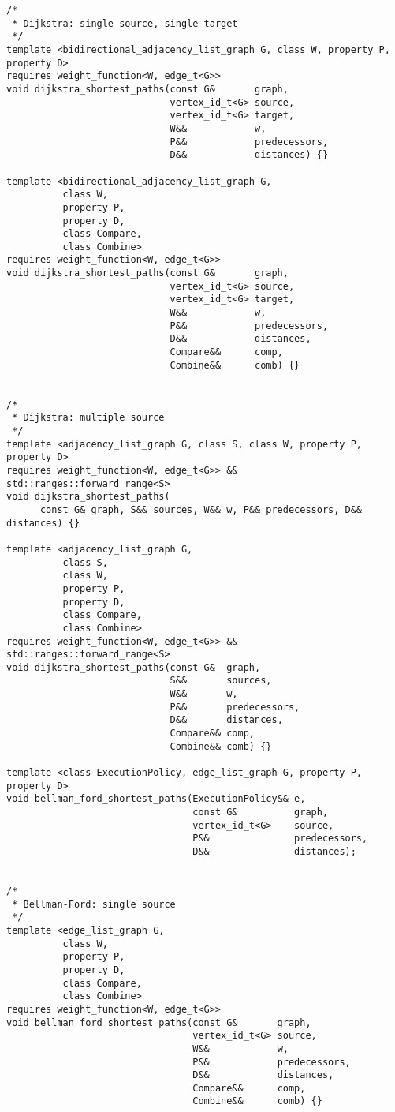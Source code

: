 \begin{lstlisting}
/*
 * Dijkstra: single source, single target
 */
template <bidirectional_adjacency_list_graph G, class W, property P, property D>
requires weight_function<W, edge_t<G>>
void dijkstra_shortest_paths(const G&       graph,
                             vertex_id_t<G> source,
                             vertex_id_t<G> target,
                             W&&            w,
                             P&&            predecessors,
                             D&&            distances) {}

template <bidirectional_adjacency_list_graph G,
          class W,
          property P,
          property D,
          class Compare,
          class Combine>
requires weight_function<W, edge_t<G>>
void dijkstra_shortest_paths(const G&       graph,
                             vertex_id_t<G> source,
                             vertex_id_t<G> target,
                             W&&            w,
                             P&&            predecessors,
                             D&&            distances,
                             Compare&&      comp,
                             Combine&&      comb) {}


/*
 * Dijkstra: multiple source
 */
template <adjacency_list_graph G, class S, class W, property P, property D>
requires weight_function<W, edge_t<G>> && std::ranges::forward_range<S>
void dijkstra_shortest_paths(
      const G& graph, S&& sources, W&& w, P&& predecessors, D&& distances) {}

template <adjacency_list_graph G,
          class S,
          class W,
          property P,
          property D,
          class Compare,
          class Combine>
requires weight_function<W, edge_t<G>> && std::ranges::forward_range<S>
void dijkstra_shortest_paths(const G&  graph,
                             S&&       sources,
                             W&&       w,
                             P&&       predecessors,
                             D&&       distances,
                             Compare&& comp,
                             Combine&& comb) {}

template <class ExecutionPolicy, edge_list_graph G, property P, property D>
void bellman_ford_shortest_paths(ExecutionPolicy&& e,
                                 const G&          graph,
                                 vertex_id_t<G>    source,
                                 P&&               predecessors,
                                 D&&               distances);


/*
 * Bellman-Ford: single source
 */
template <edge_list_graph G,
          class W,
          property P,
          property D,
          class Compare,
          class Combine>
requires weight_function<W, edge_t<G>>
void bellman_ford_shortest_paths(const G&       graph,
                                 vertex_id_t<G> source,
                                 W&&            w,
                                 P&&            predecessors,
                                 D&&            distances,
                                 Compare&&      comp,
                                 Combine&&      comb) {}


\end{lstlisting}
